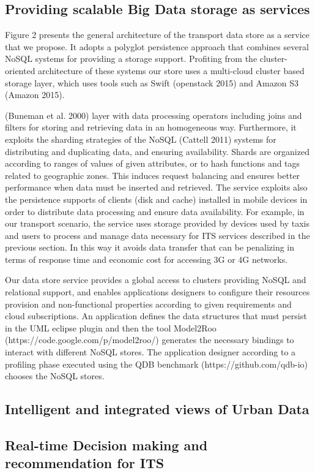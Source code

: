 \subsection{Providing scalable Big Data storage as services}

Figure 2 presents the general architecture of the transport data store as a service that we propose. It adopts a polyglot persistence approach that combines several NoSQL systems for providing a storage support. Profiting from the cluster-oriented architecture of these systems our store uses a multi-cloud cluster based storage layer, which uses tools such as Swift (openstack 2015) and Amazon S3 (Amazon 2015). 

(Buneman et al. 2000) layer with data processing operators including joins and filters for storing and retrieving data in an homogeneous way.
Furthermore, it exploits the sharding strategies of the NoSQL (Cattell 2011) systems for distributing and duplicating data, and ensuring availability. Shards are organized according to ranges of values of given attributes, or to hash functions and tags related to geographic zones. This induces request balancing and ensures better performance when data must be inserted and retrieved.
The service exploits also the persistence supports of clients (disk and cache) installed in mobile devices in order to distribute data processing and ensure data availability. For example, in our transport scenario, the service uses storage provided by devices used by taxis and users to process and manage data necessary for ITS services described in the previous section. In this way it avoids data transfer that can be penalizing in terms of response time and economic cost for accessing 3G or 4G networks.

Our data store service provides a global access to clusters providing NoSQL and relational support, and enables applications designers to configure their resources provision and non-functional properties according to given requirements and cloud subscriptions. An application defines the data structures that must persist in the UML eclipse plugin and then the tool Model2Roo (https://code.google.com/p/model2roo/) generates the necessary bindings to interact with different NoSQL stores. The application designer according to a profiling phase executed using the QDB benchmark (https://github.com/qdb-io) chooses the NoSQL stores. 


\subsection{Intelligent and integrated views of Urban Data}

\subsection{Real-time Decision making and recommendation for ITS}

